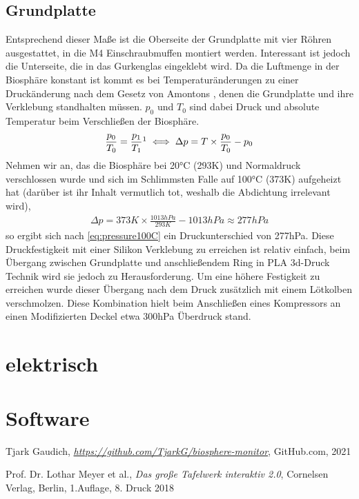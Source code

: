 \documentclass[12pt, a4paper, oneside]{report}
\begin{document}
\section{Grundplatte}
Entsprechend dieser Maße ist die Oberseite der Grundplatte mit vier Röhren ausgestattet, in die M4 Einschraubmuffen montiert werden. Interessant ist jedoch die Unterseite, die in das Gurkenglas eingeklebt wird. Da die Luftmenge in der Biosphäre konstant ist kommt es bei Temperaturänderungen zu einer Druckänderung nach  dem Gesetz von Amontons \cite[S.~119]{Tafelwerk}, denen die Grundplatte und ihre Verklebung standhalten müssen. $p_0$ und $T_0$ sind dabei Druck und absolute Temperatur beim Verschließen der Biosphäre.
\begin{align}
\frac{p_0}{T_0} = \frac{p_1}{T_1} \footnote{}
\iff \Delta p = T  \times \frac{p_0}{T_0} - p_0
\label{eq:pressure}
\end{align}
Nehmen wir an, das die Biosphäre bei 20°C (293K) und Normaldruck verschlossen wurde und sich im Schlimmsten Falle auf 100°C (373K) aufgeheizt hat (darüber ist ihr Inhalt vermutlich tot, weshalb die Abdichtung irrelevant wird),
\begin{align}
\Delta p = 373K  \times \frac{1013hPa}{293K} - 1013hPa \approx 277hPa
\label{eq:pressure100C}
\end{align}
so ergibt sich nach \autoref{eq:pressure100C} ein Druckunterschied von 277hPa. Diese Druckfestigkeit mit einer Silikon Verklebung zu erreichen ist relativ einfach, beim Übergang zwischen Grundplatte und anschließendem Ring in PLA 3d-Druck Technik wird sie jedoch zu Herausforderung. Um eine höhere Festigkeit zu erreichen wurde dieser Übergang nach dem Druck zusätzlich mit einem Lötkolben verschmolzen. Diese Kombination hielt beim Anschließen eines Kompressors an einen Modifizierten Deckel etwa 300hPa Überdruck stand.

\chapter{elektrisch}
\label{ch:elektrisch}
\chapter{Software}

\begin{thebibliography}{9}

  Tjark Gaudich,
  \textit{\url{https://github.com/TjarkG/biosphere-monitor}},
  GitHub.com,
  2021
  
  Prof. Dr. Lothar Meyer et al.,
  \textit{Das große Tafelwerk interaktiv 2.0},
  Cornelsen Verlag, Berlin,
  1.Auflage, 8. Druck 2018

\end{thebibliography}
\end{document}
